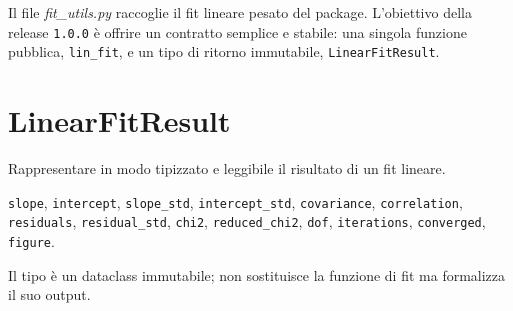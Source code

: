 \vspace{-10pt}
Il file \textit{fit\_utils.py} raccoglie il fit lineare pesato del package. L'obiettivo della release \texttt{1.0.0} è offrire un contratto semplice e stabile: una singola funzione pubblica, \texttt{lin\_fit}, e un tipo di ritorno immutabile, \texttt{LinearFitResult}.

\section{LinearFitResult}
\label{sec:linear-fit-result}
\begin{apidesc}
  \item[\textbf{Scopo}]
    Rappresentare in modo tipizzato e leggibile il risultato di un fit lineare.
  \item[\textbf{Campi pubblici}]
    \texttt{slope}, \texttt{intercept}, \texttt{slope\_std}, \texttt{intercept\_std},
    \texttt{covariance}, \texttt{correlation}, \texttt{residuals}, \texttt{residual\_std},
    \texttt{chi2}, \texttt{reduced\_chi2}, \texttt{dof}, \texttt{iterations},
    \texttt{converged}, \texttt{figure}.
  \item[\textbf{Note}]
    Il tipo è un dataclass immutabile; non sostituisce la funzione di fit ma formalizza il suo output.
\end{apidesc}

